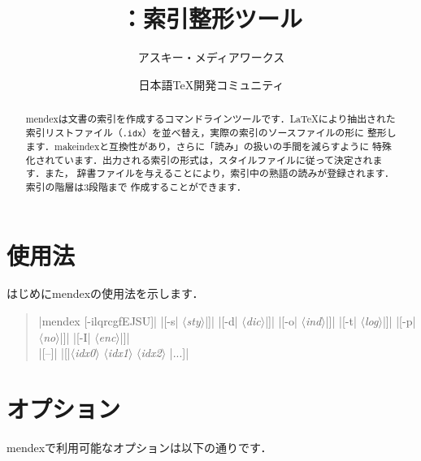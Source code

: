 \documentclass[a4paper]{jsarticle}
\title{\SoftName{mendex}：索引整形ツール}
\author{アスキー・メディアワークス \and 日本語\TeX 開発コミュニティ}
\newenvironment{syntax}{\begin{quote}\small}{\end{quote}}
\newcommand{\SoftName}[1]{\textsf{#1}}
\newcommand{\FileExtension}[1]{\texttt{.#1}}
\newcommand{\Meta}[1]{$\langle$\mbox{}\textit{#1}\mbox{}$\rangle$}
\begin{document}
\maketitle

\begin{abstract}
\SoftName{mendex}は文書の索引を作成するコマンドラインツールです．\LaTeX により抽出された
索引リストファイル（\FileExtension{idx}）を並べ替え，実際の索引のソースファイルの形に
整形します．\SoftName{makeindex}と互換性があり，さらに「読み」の扱いの手間を減らすように
特殊化されています．出力される索引の形式は，スタイルファイルに従って決定されます．また，
辞書ファイルを与えることにより，索引中の熟語の読みが登録されます．索引の階層は3段階まで
作成することができます．
\end{abstract}

\section{使用法}

はじめに\SoftName{mendex}の使用法を示します．
%
\begin{syntax}
|mendex [-ilqrcgfEJSU]|
|[-s| \Meta{sty}|]|
|[-d| \Meta{dic}|]|
|[-o| \Meta{ind}|]|
|[-t| \Meta{log}|]|
|[-p| \Meta{no}|]|
|[-I| \Meta{enc}|]| \\
%
|[--]|
|[|\Meta{idx0} \Meta{idx1} \Meta{idx2} |...]|
\end{syntax}

\section{オプション}

\SoftName{mendex}で利用可能なオプションは以下の通りです．
\end{document}
